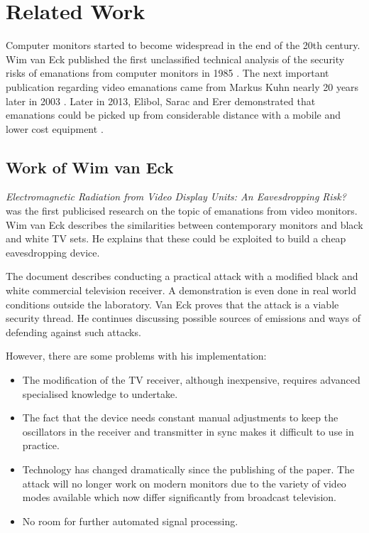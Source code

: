 \documentclass[a4paper,12pt,twoside,openright]{report}
\begin{document}
\section{Related Work}
\label{sec:RelatedWork}

Computer monitors started to become widespread in the end of the 20th century. Wim van Eck published the first unclassified technical analysis of the security risks of emanations from computer monitors in 1985 \cite{van1985electromagnetic}. The next important publication regarding video emanations came from Markus Kuhn nearly 20 years later in 2003 \cite{kuhn2003compromising}. Later in 2013, Elibol, Sarac and Erer demonstrated that emanations could be picked up from considerable distance with a mobile and lower cost equipment \cite{elibol2012realistic}.

\subsection{Work of Wim van Eck}

\textit{Electromagnetic Radiation from Video Display Units: An Eavesdropping Risk?} \cite{van1985electromagnetic} was the first publicised research on the topic of emanations from video monitors. Wim van Eck describes the similarities between contemporary monitors and black and white TV sets. He explains that these could be exploited to build a cheap eavesdropping device.

The document describes conducting a practical attack with a modified black and white commercial television receiver. A demonstration is even done in real world conditions outside the laboratory. Van Eck proves that the attack is a viable security thread. He continues discussing possible sources of emissions and ways of defending against such attacks.

However, there are some problems with his implementation:

\begin{itemize}

  \item The modification of the TV receiver, although inexpensive, requires advanced specialised knowledge to undertake.
  \item The fact that the device needs constant manual adjustments to keep the oscillators in the receiver and transmitter in sync makes it difficult to use in practice.
  \item Technology has changed dramatically since the publishing of the paper. The attack will no longer work on modern monitors due to the variety of video modes available which now differ significantly from broadcast television. 
  \item No room for further automated signal processing.

\end{itemize}
\end{document}
